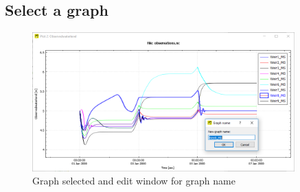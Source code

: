 \documentclass{deltares_memo}
\begin{document}
\subsection{Select a graph}
\begin{figure}[H]
    \centering    
    \includegraphics[width=0.9\textwidth]{pictures/plot_selected_graph.png}
    \caption{Graph selected and edit window for graph name\label{fig:selected graph}}
\end{figure}
\end{document}
